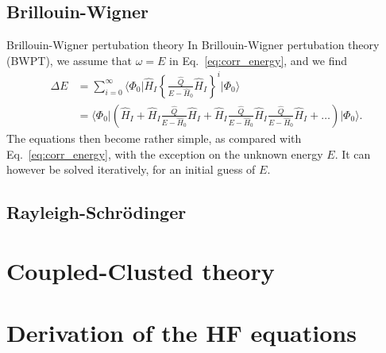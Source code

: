 \documentclass[UKenglish,aspectratio=169]{beamer}
\begin{document}
\subsection{Brillouin-Wigner}

\begin{frame}{Brillouin-Wigner pertubation theory}
    In Brillouin-Wigner pertubation theory (BWPT), we assume that $\omega = E$ in Eq.~\eqref{eq:corr_energy}, and we find
    \begin{equation}
        \begin{split}
            \Delta E &= \sum_{i = 0}^\infty \Big\langle \Phi_0 \big\vert \hat{H}_I \left\{
                \frac{\hat{Q}}{E - \hat{H}_0} \hat{H}_I
            \right\}^{i} \big\lvert \Phi_0 \Big\rangle \\
            &= \Big\langle \Phi_0 \vert \left( \hat{H}_I + \hat{H}_I \frac{\hat{Q}}{E - \hat{H}_0} \hat{H}_I + \hat{H}_I \frac{\hat{Q}}{E - \hat{H}_0} \hat{H}_I \frac{\hat{Q}}{E - \hat{H}_0} \hat{H}_I + \ldots \right) \big\lvert \Phi_0 \Big\rangle.
        \end{split}
    \end{equation}
    The equations then become rather simple, as compared with Eq.~\eqref{eq:corr_energy}, with the exception on the unknown energy $E$.
    It can however be solved iteratively, for an initial guess of $E$.
\end{frame}

\subsection{Rayleigh-Schrödinger}

\section{Coupled-Clusted theory}

\appendix
\section{Derivation of the HF equations}
\end{document}
